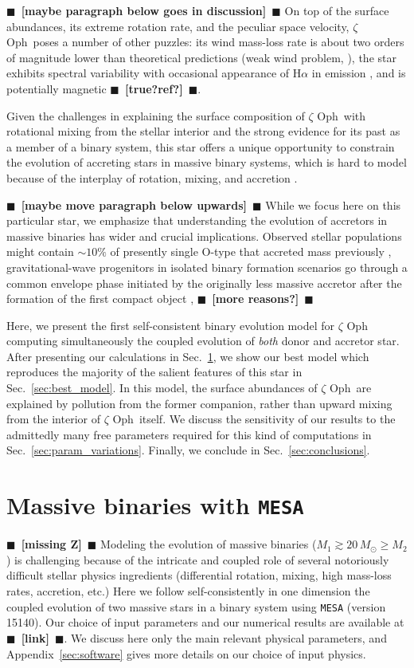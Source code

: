 \documentclass[twocolumn,twocolappendix,trackchanges]{aastex63}
\DeclareRobustCommand{\Secref}[1]{Sec.~\ref{#1}}
\newcommand{\zoph}{$\zeta$ Oph}
\newcommand{\todo}[1]{{\large $\blacksquare$~\textbf{\color{red}[#1]}}~$\blacksquare$}
\begin{document}
\todo{maybe paragraph below goes in discussion}
On top of the surface abundances, its extreme rotation rate, and the
peculiar space velocity, \zoph\ poses a number of other
puzzles: its wind mass-loss rate is about two orders of magnitude
lower than theoretical predictions (weak wind problem,
\citealt{marcolino:09}), the star exhibits spectral variability with
occasional appearance of H$\alpha$ in emission
\citep[e.g.,][]{walker:79}, and is potentially magnetic \todo{true?ref?}.

Given the challenges in explaining the surface composition of \zoph\
with rotational mixing from the stellar interior and the strong
evidence for its past as a member of a binary system, this star offers
a unique opportunity to constrain the evolution of accreting stars in
massive binary systems, which is hard to model because of the
interplay of rotation, mixing, and accretion
\citep[e.g.][]{hellings:83, hellings:84, braun:95}.

\todo{maybe move paragraph below upwards}
While we focus here on this particular star, we emphasize that
understanding the evolution of  accretors in massive binaries has
wider and crucial implications. Observed stellar populations might
contain $\sim10\%$ of presently single O-type that accreted mass
previously \citep{renzo:19walk}, gravitational-wave progenitors in
isolated binary formation scenarios go through a common envelope phase
initiated by the originally less massive accretor after the formation
of the first compact object \citep[e.g.,][]{belczynski:16nat, tauris:17,
  law-smith:20}, \todo{more reasons?}

Here, we present the first self-consistent binary evolution model for
$\zeta$ Oph computing simultaneously the coupled evolution of
\emph{both} donor
and accretor star. After presenting our calculations in
\Secref{sec:methods}, we show our best model which reproduces the
majority of the salient features of this star in
\Secref{sec:best_model}. In this model, the surface abundances of
\zoph\ are explained by pollution from the former companion, rather
than upward mixing from the interior of \zoph\ itself. We discuss the
sensitivity of our results to the admittedly many free parameters
required for this kind of computations in
\Secref{sec:param_variations}. Finally, we conclude in
\Secref{sec:conclusions}.

\section{Massive binaries with \texttt{MESA}}
\label{sec:methods}
\todo{missing Z}
Modeling the evolution of massive binaries
($M_1\gtrsim 20\,M_\odot \geq M_2$) is challenging because of the
intricate and coupled role of several notoriously difficult stellar
physics ingredients (differential rotation, mixing, high mass-loss
rates, accretion, etc.) Here we follow self-consistently in one
dimension the coupled evolution of two massive stars in a binary
system using \texttt{MESA} (version 15140). Our choice of input
parameters and our numerical results are available at \todo{link}. We
discuss here only the main relevant physical parameters, and
Appendix~\ref{sec:software} gives more details on our choice of input
physics.
\end{document}
